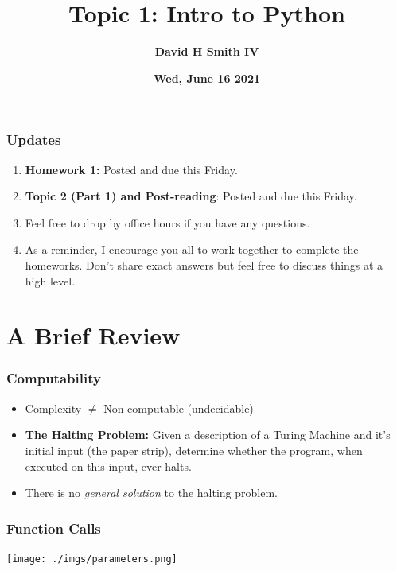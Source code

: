 \documentclass{beamer}
\title{\textbf{Topic 1: Intro to Python}}
\author{\textbf{David H Smith IV}}
\institute[\textbf{UIUC}]{\textbf{University of Illinois Urbana-Champaign}}
\date{\textbf{Wed, June 16 2021}}
\begin{document}
\frame{\titlepage}

\begin{frame}
  \frametitle{Updates}
  \begin{enumerate}
    \item \textbf{Homework 1:} Posted and due this Friday.
    \item \textbf{Topic 2 (Part 1) and Post-reading}: Posted and due this Friday.
    \item Feel free to drop by office hours if you have any questions.
    \item As a reminder, I encourage you all to work together to complete the homeworks. Don't share exact answers but feel free to discuss things at a high level.
  \end{enumerate}
\end{frame}

\section{A Brief Review}

\begin{frame}
  \frametitle{Computability}
  \begin{itemize}
    \item Complexity $\neq$ Non-computable (undecidable)
      \pause
    \item \textbf{The Halting Problem: }Given a description of a Turing Machine and it's initial input (the paper strip), determine whether the program, when executed on this input, ever halts.
      \pause
    \item There is no \textit{general solution} to the halting problem.
  \end{itemize}
\end{frame}

\begin{frame}
  \frametitle{Function Calls}
  \centering
  \texttt{[image: ./imgs/parameters.png]}
\end{frame}
\end{document}

